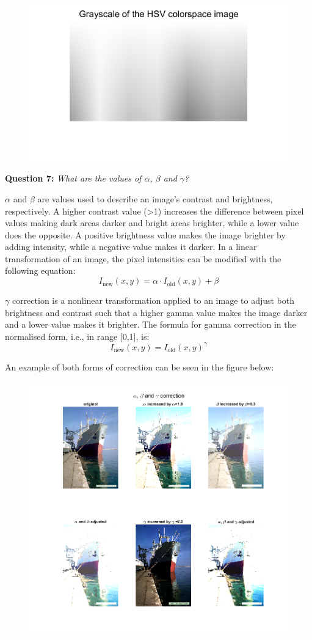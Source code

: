 \begin{figure}[H]
    \centering
    \includegraphics[width=0.5\linewidth]{Doc/Graphics/Part1/Part1_Question6b.png}
    \label{fig:enter-label}
\end{figure}



\textbf{Question 7:}
\textit{What are the values of $\alpha$, $\beta$ and $\gamma$?}

$\alpha$ and $\beta$ are values used to describe an image's contrast and brightness, respectively. 
A higher contrast value (>1) increases the difference between pixel values making dark areas darker and bright areas brighter, while a lower value does the opposite. A positive brightness value makes the image brighter by adding intensity, while a negative value makes it darker.
In a linear transformation of an image, the pixel intensities can be modified with the following equation:
\[
I_{\text{new}}(x, y) = \alpha \cdot I_{\text{old}}(x, y) + \beta
\]

$\gamma$ correction is a nonlinear transformation applied to an image to adjust both brightness and contrast such that a higher gamma value makes the image darker and a lower value makes it brighter. The formula for gamma correction in the normalised form, i.e., in range [0,1], is:
\[
I_{\text{new}}(x, y) = I_{\text{old}}(x, y)^\gamma
\]

An example of both forms of correction can be seen in the figure below:

\begin{figure}[H]
    \centering
    \includegraphics[width=0.6\linewidth]{Doc/Graphics/Part1/Q7.png}
\end{figure}


